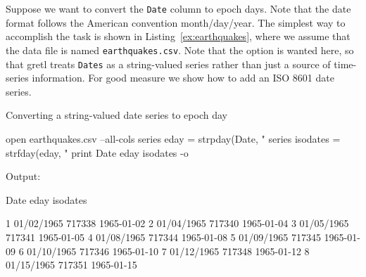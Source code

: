 \begin{center}
\end{center}

Suppose we want to convert the \texttt{Date} column to epoch
days. Note that the date format follows the American convention
month/day/year. The simplest way to accomplish the task is shown in
Listing~\ref{ex:earthquakes}, where we assume that the data file is
named \texttt{earthquakes.csv}. Note that the  option
is wanted here, so that gretl treats \texttt{Dates} as a string-valued
series rather than just a source of time-series information. For good
measure we show how to add an ISO 8601 date series.

\begin{script}[htbp]
  \caption{Converting a string-valued date series to epoch day}
  \label{ex:earthquakes}
\begin{scodebit}
open earthquakes.csv --all-cols
series eday = strpday(Date, "%
series isodates = strfday(eday, "%
print Date eday isodates -o
\end{scodebit}
  
Output:
\begin{outbit}
          Date         eday     isodates

1   01/02/1965       717338   1965-01-02
2   01/04/1965       717340   1965-01-04
3   01/05/1965       717341   1965-01-05
4   01/08/1965       717344   1965-01-08
5   01/09/1965       717345   1965-01-09
6   01/10/1965       717346   1965-01-10
7   01/12/1965       717348   1965-01-12
8   01/15/1965       717351   1965-01-15
\end{outbit}
\end{script}

